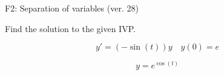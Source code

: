 \begin{exercise}
  \begin{exerciseTitle}F2: Separation of variables (ver. 28)\end{exerciseTitle}
  \begin{exerciseStatement}
    
Find the solution to the given IVP.

    
\[y'=( -\sin\left(t\right) )y\hspace{1em} y(0)= e\]

  \end{exerciseStatement}
  \begin{exerciseAnswer}
    
\[y= e^{\cos\left(t\right)}\]

  \end{exerciseAnswer}
\end{exercise}